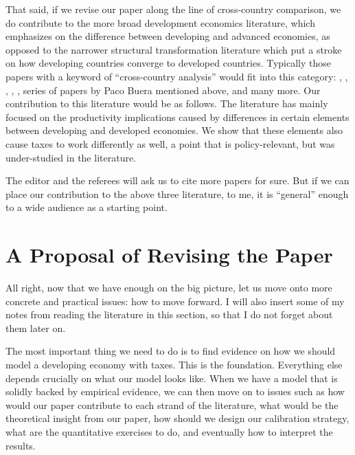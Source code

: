 \documentclass[twoside,11pt,leqno]{article}
\begin{document}
That said, if we revise our paper along the line of cross-country comparison, we do contribute to the more broad development economics literature, which emphasizes on the difference between developing and advanced economies, as opposed to the narrower structural transformation literature which put a stroke on how developing countries converge to developed countries. Typically those papers with a keyword of ``cross-country analysis'' would fit into this category: \citet{Gollinetal:2004, Gollinetal:2007}, \citet{Restucciaetal:2008}, \citet{Bartelsmanetal:2013}, \citet{LagakosWaugh:2013}, \citet{AdamopoulosRestuccia:2014}, series of papers by Paco Buera mentioned above, and many more. Our contribution to this literature would be as follows. The literature has mainly focused on the productivity implications caused by differences in certain elements between developing and developed economies. We show that these elements also cause taxes to work differently as well, a point that is policy-relevant, but was under-studied in the literature.

The editor and the referees will ask us to cite more papers for sure. But if we can place our contribution to the above three literature, to me, it is ``general'' enough to a wide audience as a starting point.

\section{A Proposal of Revising the Paper}

All right, now that we have enough on the big picture, let us move onto more concrete and practical issues: how to move forward. I will also insert some of my notes from reading the literature in this section, so that I do not forget about them later on.

The most important thing we need to do is to find evidence on how we should model a developing economy with taxes. This is the foundation. Everything else depends crucially on what our model looks like. When we have a model that is solidly backed by empirical evidence, we can then move on to issues such as how would our paper contribute to each strand of the literature, what would be the theoretical insight from our paper, how should we design our calibration strategy, what are the quantitative exercises to do, and eventually how to interpret the results.
\end{document}
